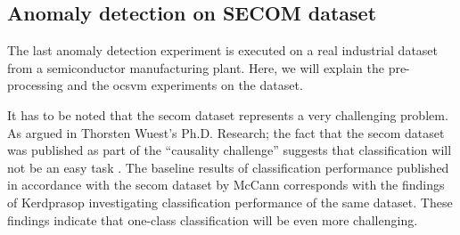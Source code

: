 \documentclass[english, a4paper]{report}
\begin{document}
{{        \subsection{Anomaly detection on SECOM dataset} \label{secomAD}
        {
            The last anomaly detection experiment is executed on a real industrial dataset from a semiconductor manufacturing plant. Here, we will explain the pre-processing and the \gls{ocsvm} experiments on the dataset.
            \par
            It has to be noted that the \gls{secom} dataset represents a very challenging problem. As argued in Thorsten Wuest's Ph.D. Research; the fact that the \gls{secom} dataset was published as part of the “causality challenge” suggests that classification will not be an easy task \cite{supervisedMLsecom}. The baseline results of classification performance published in accordance with the \gls{secom} dataset by McCann \cite{pmlr-v6-mccann10a} corresponds with the findings of Kerdprasop \cite{kerdprasop2011data} investigating classification performance of the same dataset. These findings indicate that one-class classification will be even more challenging.  
            
}}}
\end{document}

